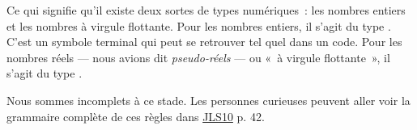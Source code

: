 Ce qui signifie qu'il existe deux sortes de types numériques~: les nombres
entiers et les nombres à virgule flottante. Pour les nombres entiers, il s'agit
du type . C'est un symbole terminal qui peut se retrouver tel quel dans
un code. Pour les nombres réels — nous avions dit \textit{pseudo-réels} — ou «~à
virgule flottante~», il s'agit du type .

Nous sommes incomplets à ce stade. Les personnes curieuses peuvent aller voir la grammaire complète de ces règles dans \href{https://docs.oracle.com/javase/specs/jls/se10/jls10.pdf}{JLS10} p. 42.

